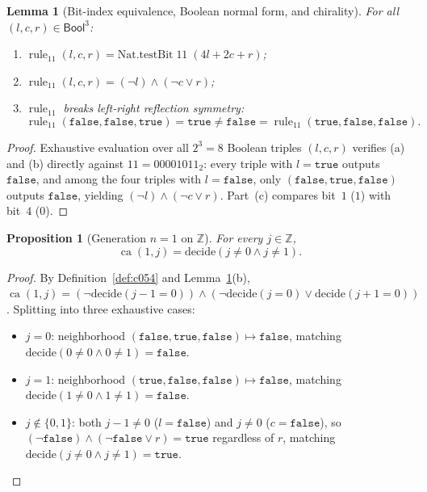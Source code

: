 \documentclass[11pt]{article}
\newtheorem{proposition}[theorem]{Proposition}
\newtheorem{lemma}[theorem]{Lemma}
\theoremstyle{definition}
\newcommand{\Z}{\mathbb{Z}}
\newcommand{\ruleTT}{\operatorname{rule}_{11}}
\newcommand{\ca}{\operatorname{ca}}
\begin{document}
\begin{lemma}[Bit-index equivalence, Boolean normal form, and chirality]
\label{lem:rule11}
For all $(l, c, r) \in \mathsf{Bool}^3$:
\begin{enumerate}
\item[\textup{(a)}] $\ruleTT(l, c, r) = \mathrm{Nat.testBit}\;11\;(4l + 2c + r)$;
\item[\textup{(b)}] $\ruleTT(l, c, r) = (\neg l) \land (\neg c \lor r)$;
\item[\textup{(c)}] $\ruleTT$ breaks left-right reflection symmetry:
\[
\ruleTT(\mathtt{false}, \mathtt{false}, \mathtt{true}) = \mathtt{true} \ne \mathtt{false} = \ruleTT(\mathtt{true}, \mathtt{false}, \mathtt{false}).
\]
\end{enumerate}
\end{lemma}

\begin{proof}
Exhaustive evaluation over all $2^3 = 8$ Boolean triples $(l, c, r)$ verifies (a) and (b) directly against $11 = 00001011_2$: every triple with $l = \mathtt{true}$ outputs $\mathtt{false}$, and among the four triples with $l = \mathtt{false}$, only $(\mathtt{false}, \mathtt{true}, \mathtt{false})$ outputs $\mathtt{false}$, yielding $(\neg l) \land (\neg c \lor r)$. Part~(c) compares bit~$1$ ($1$) with bit~$4$ ($0$).
\end{proof}

\begin{proposition}[Generation $n = 1$ on $\Z$]
\label{prop:ca-one}
For every $j \in \Z$,
\[
\ca(1, j) = \mathrm{decide}(j \ne 0 \land j \ne 1).
\]
\end{proposition}

\begin{proof}
By Definition~\ref{def:c054} and Lemma~\ref{lem:rule11}(b), $\ca(1, j) = (\neg \mathrm{decide}(j - 1 = 0)) \land (\neg \mathrm{decide}(j = 0) \lor \mathrm{decide}(j + 1 = 0))$. Splitting into three exhaustive cases:
\begin{itemize}
\item $j = 0$: neighborhood $(\mathtt{false}, \mathtt{true}, \mathtt{false}) \mapsto \mathtt{false}$, matching $\mathrm{decide}(0 \ne 0 \land 0 \ne 1) = \mathtt{false}$.
\item $j = 1$: neighborhood $(\mathtt{true}, \mathtt{false}, \mathtt{false}) \mapsto \mathtt{false}$, matching $\mathrm{decide}(1 \ne 0 \land 1 \ne 1) = \mathtt{false}$.
\item $j \notin \{0, 1\}$: both $j - 1 \ne 0$ ($l = \mathtt{false}$) and $j \ne 0$ ($c = \mathtt{false}$), so $(\neg \mathtt{false}) \land (\neg \mathtt{false} \lor r) = \mathtt{true}$ regardless of $r$, matching $\mathrm{decide}(j \ne 0 \land j \ne 1) = \mathtt{true}$. \qedhere
\end{itemize}
\end{proof}
\end{document}

